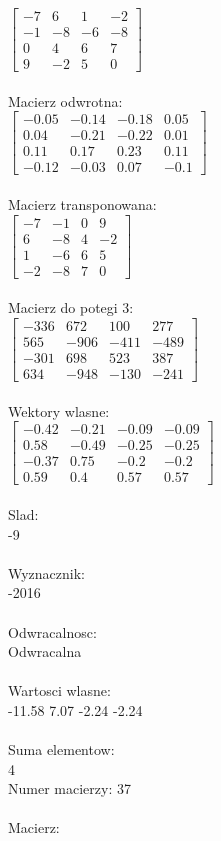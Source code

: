 \documentclass[a4paper,12pt]{article}
\begin{document}
$\begin{bmatrix} -7&6&1&-2\\-1&-8&-6&-8\\0&4&6&7\\9&-2&5&0 \end{bmatrix}$
\\
\\
Macierz odwrotna:\\

$\begin{bmatrix} -0.05&-0.14&-0.18&0.05\\0.04&-0.21&-0.22&0.01\\0.11&0.17&0.23&0.11\\-0.12&-0.03&0.07&-0.1 \end{bmatrix}$
\\
\\
Macierz transponowana:\\

$\begin{bmatrix} -7&-1&0&9\\6&-8&4&-2\\1&-6&6&5\\-2&-8&7&0 \end{bmatrix}$
\\
\\
Macierz do potegi 3:\\

$\begin{bmatrix} -336&672&100&277\\565&-906&-411&-489\\-301&698&523&387\\634&-948&-130&-241 \end{bmatrix}$
\\
\\
Wektory wlasne:\\

$\begin{bmatrix} -0.42&-0.21&-0.09&-0.09\\0.58&-0.49&-0.25&-0.25\\-0.37&0.75&-0.2&-0.2\\0.59&0.4&0.57&0.57 \end{bmatrix}$
\\
\\
Slad:\\
-9
\\
\\
Wyznacznik:\\
-2016
\\
\\
Odwracalnosc:\\
Odwracalna
\\
\\
Wartosci wlasne:\\
-11.58 7.07 -2.24 -2.24
\\
\\
Suma elementow:\\
4
\\
\newpage
Numer macierzy:
37
\\
\\
Macierz:\\
\end{document}
